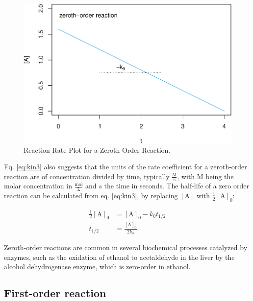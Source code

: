 \documentclass[
  9pt,
]{extbook}
\theoremstyle{definition}
\theoremstyle{definition}
\theoremstyle{definition}
\theoremstyle{remark}
\begin{document}
\begin{figure}

{\centering \includegraphics{pchem1_files/figure-latex/figk1-1} 

}

\caption{Reaction Rate Plot for a Zeroth-Order Reaction.}\label{fig:figk1}
\end{figure}

Eq. \eqref{eq:kin3} also suggests that the units of the rate coefficient for a zeroth-order reaction are of concentration divided by time, typically \(\frac{\mathrm{M}}{\mathrm{s}}\), with \(\mathrm{M}\) being the molar concentration in \(\frac{\mathrm{mol}}{\mathrm{L}}\) and \(s\) the time in seconds.
The half-life of a zero order reaction can be calculated from eq. \eqref{eq:kin3}, by replacing \([\mathrm{A}]\) with \(\frac{1}{2}[\mathrm{A}]_0\):

\begin{equation}
\begin{aligned}
\frac{1}{2}[\mathrm{A}]_0 &=[\mathrm{A}]_0 -k_0 t_{1/2} \\
t_{1/2} &= \frac{[\mathrm{A}]_0}{2k_0}.
\end{aligned}
\label{eq:kin4}
\end{equation}

Zeroth-order reactions are common in several biochemical processes catalyzed by enzymes, such as the oxidation of ethanol to acetaldehyde in the liver by the alcohol dehydrogenase enzyme, which is zero-order in ethanol.

\hypertarget{first-order-reaction}{%
\subsection{First-order reaction}\label{first-order-reaction}}
\end{document}
